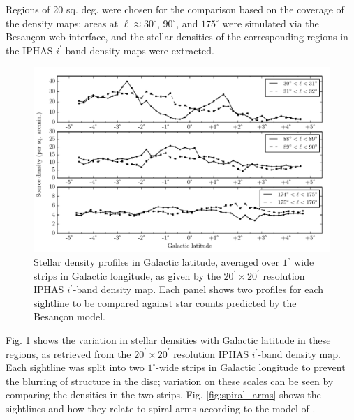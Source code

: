 \documentclass[a4paper,useAMS,usenatbib]{mn2e}
\begin{document}
Regions of 20 sq. deg. were chosen for the comparison based on the coverage of
the density maps; areas at $\ell \approx
30^{\circ}$, $90^{\circ}$, and $175^{\circ}$ were simulated via the
Besan\c{c}on web interface, and the stellar densities of the corresponding
regions in the IPHAS $i^{\prime}$-band density maps were extracted.

\begin{figure}
\begin{center}
\includegraphics[width=1.0\linewidth]{figures/iphas_comparison.pdf} 
\caption{\footnotesize Stellar density profiles in Galactic latitude, averaged over $1^{\circ}$ wide strips in Galactic longitude, as given by the $20^{\prime}\times20^{\prime}$ resolution IPHAS $i^{\prime}$-band density map. Each panel shows two profiles for each sightline to be compared against star counts predicted by the Besan\c{c}on model.}
\label{fig:iphas_densities}
\end{center}
\end{figure}

Fig. \ref{fig:iphas_densities} shows the variation in stellar densities with Galactic latitude in these regions, as retrieved from the $20^{\prime}\times20^{\prime}$ resolution IPHAS $i^{\prime}$-band density map. Each sightline was split into two $1^{\circ}$-wide strips in Galactic longitude to prevent the blurring of structure in the disc; variation on these scales can be seen by comparing the densities in the two strips. Fig. \ref{fig:spiral_arms} shows the sightlines and how they relate to spiral arms according to the model of \citet{Vallee2008}.
\end{document}
